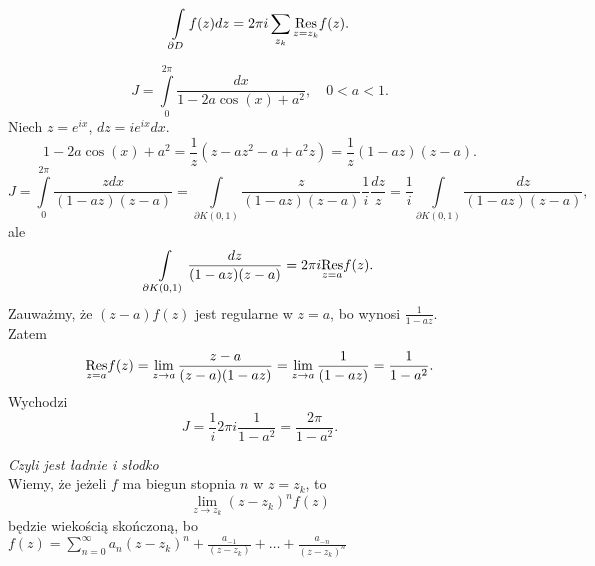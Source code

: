 \documentclass[../main.tex]{subfiles}
\begin{document}
    \[
        \int\limits_{\partial D}f(z) dz = 2\pi i \sum_{z_k}^{} \underset{z = z_k}{\operatorname{Res}}f(z)
    .\]
\begin{przyklad}
    \[
        J = \int\limits_0^{2\pi} \frac{dx}{1-2a\cos(x) + a^2},\quad 0 < a < 1
    .\]
Niech $z = e^{ix}$, $dz = ie^{ix}dx$.
\[
    1-2a\cos(x) + a^2 = \frac{1}{z}\left(z-az^2-a+a^2z\right) = \frac{1}{z}(1-az)(z-a)
.\]
\[
    J = \int\limits_0^{2\pi} \frac{z dx}{(1-az)(z-a)} = \int\limits_{\partial K(0,1)} \frac{z}{(1-az)(z-a)} \frac{1}{i}\frac{dz}{z} = \frac{1}{i}\int\limits_{\partial K(0,1)} \frac{dz}{(1-az)(z-a)}
,\]
ale
\[
    \int\limits_{\partial K(0,1)} \frac{dz}{(1-az)(z-a)} = 2\pi i \underset{z=a}{\operatorname{Res}} f(z)
.\]
Zauważmy, że $(z-a)f(z)$ jest regularne w $z=a$, bo wynosi $\frac{1}{1-az}$.\\
Zatem
\[
    \underset{z=a}{\operatorname{Res}} f(z) = \lim\limits_{z\to a} \frac{z-a}{(z-a)(1-az)} = \lim\limits_{z\to a} \frac{1}{(1-az)} = \frac{1}{1-a^2}
.\]
Wychodzi
\[
    J = \frac{1}{i}2\pi i \frac{1}{1-a^2} = \frac{2\pi}{1-a^2}
.\]
\end{przyklad}
\textit{Czyli jest ładnie i słodko}\\
Wiemy, że jeżeli $f$ ma biegun stopnia $n$ w $z = z_k$, to
\[
    \lim\limits_{z\to z_k} (z-z_k)^{n} f(z)
\]
będzie wiekością skończoną, bo $f(z) = \sum_{n=0}^{\infty} a_n (z-z_k)^n + \frac{a_{-1}}{(z-z_k)} + \ldots + \frac{a_{-n}}{(z-z_k)^n}$
\end{document}
